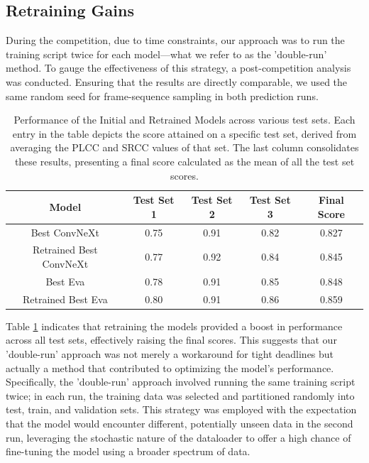 \documentclass[a4paper,12pt,openright]{book}
\begin{document}
\subsection{Retraining Gains}
During the competition, due to time constraints, our approach was to run the training script twice for each model—what we refer to as the 'double-run' method. To gauge the effectiveness of this strategy, a post-competition analysis was conducted. Ensuring that the results are directly comparable, we used the same random seed for frame-sequence sampling in both prediction runs.
\begin{table}[!htb]
\centering


\begin{tabular}{|c|c|c|c|c|}
\hline
Model & Test Set 1 & Test Set 2 & Test Set 3 & Final  Score \\
\hline
Best ConvNeXt & 0.75 & 0.91 & 0.82 & 0.827 \\
\hline
Retrained Best ConvNeXt & 0.77 & 0.92 & 0.84 & 0.845 \\
\hline
Best Eva & 0.78 & 0.91 & 0.85 & 0.848 \\
\hline
Retrained Best Eva & 0.80 & 0.91 & 0.86 & 0.859 \\
\hline
\end{tabular}
\caption{Performance of the Initial and Retrained Models across various test sets. Each entry in the table depicts the score attained on a specific test set, derived from averaging the PLCC and SRCC values of that set. The last column consolidates these results, presenting a final score calculated as the mean of all the test set scores.}



\label{tab:retraining_gains}

\end{table}

Table \ref{tab:retraining_gains} indicates that retraining the models provided a boost in performance across all test sets, effectively raising the final scores. This suggests that our 'double-run' approach was not merely a workaround for tight deadlines but actually a method that contributed to optimizing the model's performance. Specifically, the 'double-run' approach involved running the same training script twice; in each run, the training data was selected and partitioned randomly into test, train, and validation sets. This strategy was employed with the expectation that the model would encounter different, potentially unseen data in the second run, leveraging the stochastic nature of the dataloader to offer a high chance of fine-tuning the model using a broader spectrum of data.
\end{document}
